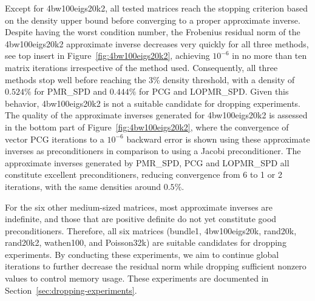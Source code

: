 \documentclass[numbers,webpdf,imanum]{ima-authoring-template}%
\theoremstyle{thmstyletwo}%
\numberwithin{equation}{section}
\begin{document}
Except for 4bw100eigs20k2, all tested matrices reach the stopping criterion based on the density upper bound before converging to a proper approximate inverse. 
Despite having the worst condition number, the Frobenius residual norm of the 4bw100eigs20k2 approximate inverse decreases very quickly for all three methods, see top insert in Figure~\ref{fig:4bw100eigs20k2}, achieving $10^{-6}$ in no more than ten matrix iterations irrespective of the method used.
Consequently, all three methods stop well before reaching the 3\% density threshold, with a density of $0.524\%$ for PMR\_SPD and $0.444\%$ for PCG and LOPMR\_SPD.
Given this behavior, 4bw100eigs20k2 is not a suitable candidate for dropping experiments.
The quality of the approximate inverses generated for 4bw100eigs20k2 is assessed in the bottom part of Figure~\ref{fig:4bw100eigs20k2}, where the convergence of vector PCG iterations to a $10^{-6}$ backward error is shown using these approximate inverses as preconditioners in comparison to using a Jacobi preconditioner. 
The approximate inverses generated by PMR\_SPD, PCG and LOPMR\_SPD  all constitute excellent preconditioners, reducing convergence from 6 to 1 or 2 iterations, with the same densities around $0.5\%$. 

For the six other medium-sized matrices, most approximate inverses are indefinite, and those that are positive definite do not yet constitute good preconditioners. 
Therefore, all six matrices (bundle1, 4bw100eigs20k, rand20k, rand20k2, wathen100, and Poisson32k) are suitable candidates for dropping experiments. 
By conducting these experiments, we aim to continue global iterations to further decrease the residual norm while dropping sufficient nonzero values to control memory usage. 
These experiments are documented in Section~\ref{sec:dropping-experiments}.
\end{document}
